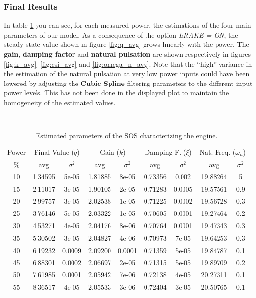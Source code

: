 \subsubsection{Final Results}

In table \ref{tab:results} you can see, for each measured power, the estimations of the four main parameters of our model.  As a consequence of the option \textit{BRAKE = ON}, the steady state value shown in figure \ref{fig:q_avg} grows linearly with the power. The  \textbf{gain}, \textbf{damping factor} and \textbf{natural pulsation} are shown respectively in figures \ref{fig:k_avg}, \ref{fig:csi_avg} and \ref{fig:omega_n_avg}. Note that the ``high'' variance in the estimation of the natural pulsation at very low power inputs could have been lowered by adjusting the \textbf{Cubic Spline} filtering parameters to the different input power levels. This has not been done in the displayed plot to maintain the  homogeneity of the estimated values.

\begin{table}[htbp]
\centering\small
\parskip=\baselineskip
\begin{tabular}{c|cc|cc|cc|cc}
Power & \multicolumn{2}{c}{Final Value ($q$)} & \multicolumn{2}{c}{Gain ($k$)} & \multicolumn{2}{c}{Damping F. ($\xi$)} & \multicolumn{2}{c}{Nat. Freq. ($\omega_n$)} \\
 $\%$ & avg & $\sigma^2$ & avg & $\sigma^2$ & avg & $\sigma^2$ & avg & $\sigma^2$ \\
\hline
10 & 1.34595 & 5e-05 & 1.81885 & 8e-05 & 0.73356 & 0.002 & 19.88264 & 5 \\
15 & 2.11017 & 3e-05 & 1.90105 & 2e-05 & 0.71283 & 0.0005 & 19.57561 & 0.9 \\
20 & 2.99757 & 3e-05 & 2.02538 & 1e-05 & 0.71225 & 0.0002 & 19.56728 & 0.3 \\
25 & 3.76146 & 5e-05 & 2.03322 & 1e-05 & 0.70605 & 0.0001 & 19.27464 & 0.2 \\
30 & 4.53271 & 4e-05 & 2.04176 & 8e-06 & 0.70764 & 0.0001 & 19.47343 & 0.3 \\
35 & 5.30502 & 3e-05 & 2.04827 & 4e-06 & 0.70973 & 7e-05 & 19.64253 & 0.3 \\
40 & 6.19232 & 0.0009 & 2.09200 & 0.0001 & 0.71359 & 5e-05 & 19.84787 & 0.1 \\
45 & 6.88301 & 0.0002 & 2.06697 & 2e-05 & 0.71315 & 5e-05 & 19.89709 & 0.2 \\
50 & 7.61985 & 0.0001 & 2.05942 & 7e-06 & 0.72138 & 4e-05 & 20.27311 & 0.1 \\
55 & 8.36517 & 4e-05 & 2.05533 & 3e-06 & 0.72404 & 3e-05 & 20.50765 & 0.1 \\
\hline
\end{tabular}
\caption{Estimated parameters of the SOS characterizing the \LEGOMOTOR{} engine.}\label{tab:results}
\end{table}

